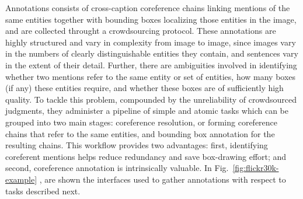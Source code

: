 Annotations consists of cross-caption coreference chains linking
mentions of the same entities together with bounding boxes localizing
those entities in the image, and are collected throught a
crowdsourcing protocol. These annotations are highly structured and
vary in complexity from image to image, since images vary in the
numbers of clearly distinguishable entities they contain, and
sentences vary in the extent of their detail. Further, there are
ambiguities involved in identifying whether two mentions refer to the
same entity or set of entities, how many boxes (if any) these entities
require, and whether these boxes are of sufficiently high quality. To
tackle this problem, compounded by the unreliability of crowdsourced
judgments, they administer a pipeline of simple and atomic tasks which
can be grouped into two main stages: coreference resolution, or
forming coreference chains that refer to the same entities, and
bounding box annotation for the resulting chains. This workflow
provides two advantages: first, identifying coreferent mentions helps
reduce redundancy and save box-drawing effort; and second, coreference
annotation is intrinsically valuable. In
Fig.~\ref{fig:flickr30k-example} \cite{plummer2015flickr30k}, are
shown the interfaces used to gather annotations with respect to tasks
described next.

